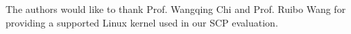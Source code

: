 \documentclass[format=acmsmall, review=true, screen=true, anonymous=false]{acmart}
\begin{document}



\begin{acks}

The authors would like to thank Prof. Wangqing Chi and Prof. Ruibo Wang
for providing a supported Linux kernel used in our SCP evaluation.


\end{acks}



\end{document}

